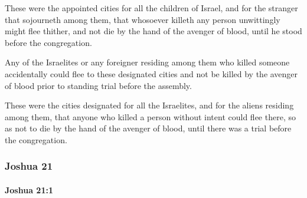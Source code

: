 			\begin{versebox}
					\item[BHS] 
					\item[ASV] These were the appointed cities for all the children of Israel, and for the stranger that sojourneth among them, that whosoever killeth any person unwittingly might flee thither, and not die by the hand of the avenger of blood, until he stood before the congregation.
					\item[NIV] Any of the Israelites or any foreigner residing among them who killed someone accidentally could flee to these designated cities and not be killed by the avenger of blood prior to standing trial before the assembly.
					\item[NRSV] These were the cities designated for all the Israelites, and for the aliens residing among them, that anyone who killed a person without intent could flee there, so as not to die by the hand of the avenger of blood, until there was a trial before the congregation.
			\end{versebox}
	\subsubsection{Joshua 21} %
		\label{JOSHUA-21}

		\paragraph{Joshua 21:1} %
			\label{JOSHUA-21-1}

